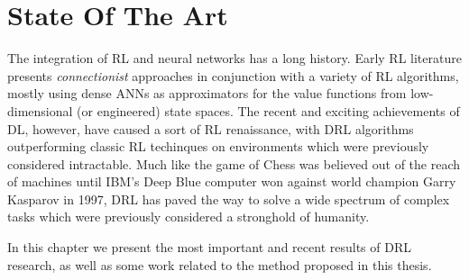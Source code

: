 \chapter{State Of The Art}
\label{chapter3_state_of_the_art}
\thispagestyle{empty}

\vspace{0.5cm}

The integration of RL and neural networks has a long history. Early 
RL literature \cite{rummery1994line, tesauro1995temporal, bertsekas1995neuro}
presents \textit{connectionist} approaches in conjunction with a variety
of RL algorithms, mostly using dense ANNs as approximators for the value 
functions from low-dimensional (or engineered) state spaces.
The recent and exciting achievements of DL, however, have caused a sort of RL 
renaissance, with DRL algorithms outperforming classic RL techinques on 
environments which were previously considered intractable. 
Much like the game of Chess was believed out of the reach of machines until 
IBM's Deep Blue computer \cite{campbell2002deep} won against world champion 
Garry Kasparov in 1997, DRL has paved the way to solve a wide spectrum of 
complex tasks which were previously considered a stronghold of humanity. 

In this chapter we present the most important and recent results of DRL research, 
as well as some work related to the method proposed in this thesis.

